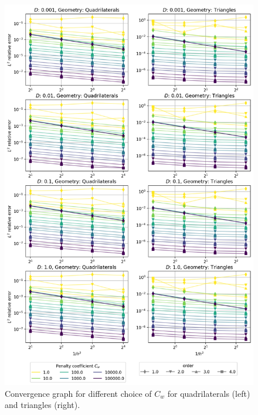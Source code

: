 \begin{figure}[p!]
	\centering
	\includegraphics[height=\textheight]{../figs/parametric/diffusion_2D/laplace.png}
		
	\caption{ Convergence graph for different choice of $C_w$  for 
		quadrilaterals (left) and triangles (right).}
	\label{fig:conv_laplace}
\end{figure}